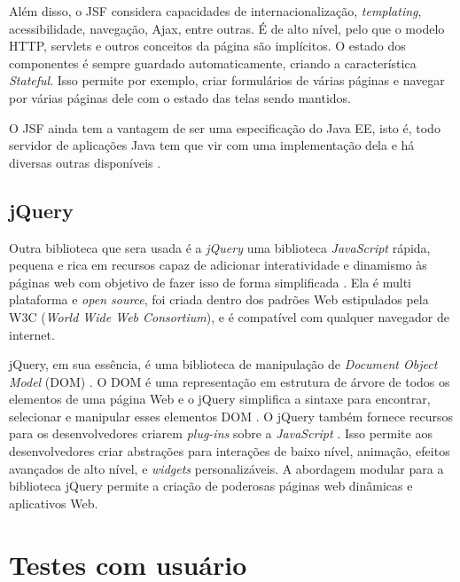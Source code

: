 Além disso, o JSF considera capacidades de internacionalização, \textit{templating}, acessibilidade, navegação, Ajax, entre outras. É de alto nível, pelo que o modelo HTTP,  	servlets e outros conceitos da página são implícitos. O estado dos componentes é sempre guardado automaticamente, criando a característica \textit{Stateful}. Isso permite por exemplo, criar formulários de várias páginas e navegar  por várias páginas dele com o estado das telas sendo mantidos\cite{geary2012core}.

O JSF ainda tem a vantagem de ser uma especificação do Java EE, isto é, todo servidor de aplicações Java tem que vir com uma implementação dela e há diversas outras disponíveis \cite{geary2012core}.



\subsection{jQuery}

Outra biblioteca que sera usada é a \textit{jQuery} uma biblioteca \textit{JavaScript} rápida, pequena e rica em recursos capaz de adicionar interatividade e dinamismo às páginas web com objetivo de fazer isso de forma simplificada \cite{bibeault2008jquery}. Ela é multi plataforma e \textit{open source}\cite{bibeault2008jquery}, foi criada dentro dos padrões Web estipulados pela W3C  (\textit{World Wide Web Consortium}), e é compatível com qualquer navegador de internet.

jQuery, em sua essência, é uma biblioteca de manipulação de \textit{Document Object Model} (DOM) \cite{duckett2014web}. O DOM é uma representação em estrutura de árvore de todos os elementos de uma página Web e o jQuery simplifica a sintaxe para encontrar, selecionar e manipular esses elementos DOM \cite{bibeault2008jquery}. O jQuery também fornece recursos para os desenvolvedores criarem \textit{plug-ins }sobre a\textit{ JavaScript} \cite{duckett2014web}. Isso permite aos desenvolvedores criar abstrações para interações de baixo nível, animação, efeitos avançados de alto nível, e \textit{widgets} personalizáveis. A abordagem modular para a biblioteca jQuery permite a criação de poderosas páginas web dinâmicas e aplicativos Web.


\section{Testes com usuário}
\label{testes-usuarios-sec}

